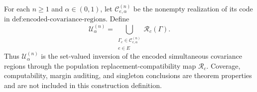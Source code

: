 For each \(n\geq1\) and \(\alpha\in(0,1)\), let \(\mathcal C^{(n)}_{e,\alpha}\) be the nonempty realization of its code in \(\text{def:encoded-covariance-regions}\). Define
\[
\mathcal U^{(n)}_{\alpha}
=\bigcup_{\substack{\Gamma_e\in\mathcal C^{(n)}_{e,\alpha}\\ e\in E}}
\mathcal R_c(\Gamma).
\]
Thus \(\mathcal U^{(n)}_{\alpha}\) is the set-valued inversion of the encoded simultaneous covariance regions through the population replacement-compatibility map \(\mathcal R_c\). Coverage, computability, margin auditing, and singleton conclusions are theorem properties and are not included in this construction definition.